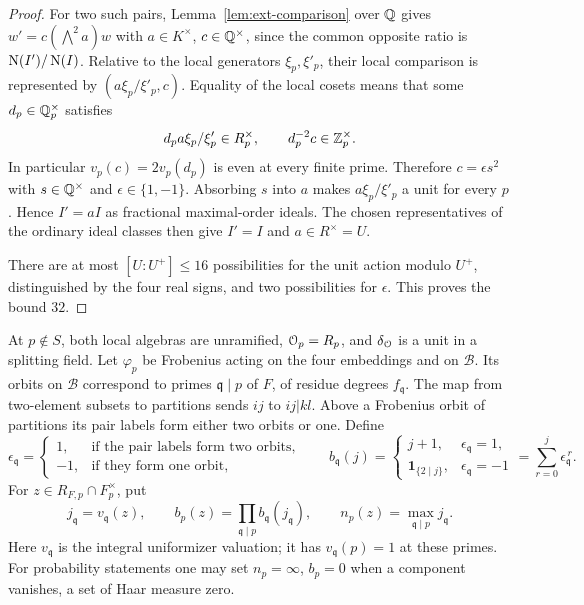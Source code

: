\begin{proof}
For two such pairs, Lemma~\ref{lem:ext-comparison} over \(\mathbb Q\) gives
\(w'=c(\bigwedge^2a)w\) with \(a\in K^\times\), \(c\in\mathbb Q^\times\), since
the common opposite ratio is \(\operatorname{N}(I')/\operatorname{N}(I)\).  Relative to the local
generators \(\xi_p,\xi'_p\), their local comparison is represented by
\((a\xi_p/\xi'_p,c)\).  Equality of the local cosets means that some
\(d_p\in\mathbb Q_p^\times\) satisfies
\[
 d_pa\xi_p/\xi'_p\in R_p^\times,\qquad d_p^{-2}c\in\mathbb Z_p^\times.
\]
In particular \(v_p(c)=2v_p(d_p)\) is even at every finite prime.
Therefore \(c=\epsilon s^2\) with \(s\in\mathbb Q^\times\) and
\(\epsilon\in\{1,-1\}\).  Absorbing \(s\) into \(a\) makes
\(a\xi_p/\xi'_p\) a unit for every \(p\).  Hence \(I'=aI\) as fractional
maximal-order ideals.  The chosen representatives of the ordinary ideal
classes then give \(I'=I\) and \(a\in R^\times=U\).

There are at most \([U:U^+]\le16\) possibilities for the unit action
modulo \(U^+\), distinguished by the four real signs, and two
possibilities for \(\epsilon\).  This proves the bound \(32\).
\end{proof}

At \(p\notin S\), both local algebras are unramified,
\(\mathcal O_p=R_p\), and \(\delta_{\mathcal O}\) is a unit in a splitting field.
Let \(\varphi_p\) be Frobenius acting on the four embeddings and on
\(\mathcal B\).  Its orbits on \(\mathcal B\) correspond to primes
\(\mathfrak q\mid p\) of \(F\), of residue degrees
\(f_{\mathfrak q}\).  The map from two-element subsets to partitions
sends \(ij\) to \(ij|kl\).  Above a Frobenius orbit of partitions its
pair labels form either two orbits or one.  Define
\[
 \epsilon_{\mathfrak q}=
 \begin{cases}
  1,&\text{if the pair labels form two orbits},\\
 -1,&\text{if they form one orbit},
 \end{cases}
 \qquad
 b_{\mathfrak q}(j)=
 \begin{cases}
  j+1,&\epsilon_{\mathfrak q}=1,\\
  \mathbf1_{\{2\mid j\}},&\epsilon_{\mathfrak q}=-1
 \end{cases}
 =\sum_{r=0}^j\epsilon_{\mathfrak q}^{\,r}.
\]
For \(z\in R_{F,p}\cap F_p^\times\), put
\begin{equation}
 j_{\mathfrak q}=v_{\mathfrak q}(z),\qquad
 b_p(z)=\prod_{\mathfrak q\mid p}b_{\mathfrak q}(j_{\mathfrak q}),
 \qquad n_p(z)=\max_{\mathfrak q\mid p}j_{\mathfrak q}.
 \label{eq:ext-unramified-factor}
\end{equation}
Here \(v_{\mathfrak q}\) is the integral uniformizer valuation; it has
\(v_{\mathfrak q}(p)=1\) at these primes.  For probability statements
one may set \(n_p=\infty\), \(b_p=0\) when a component vanishes, a set
of Haar measure zero.

